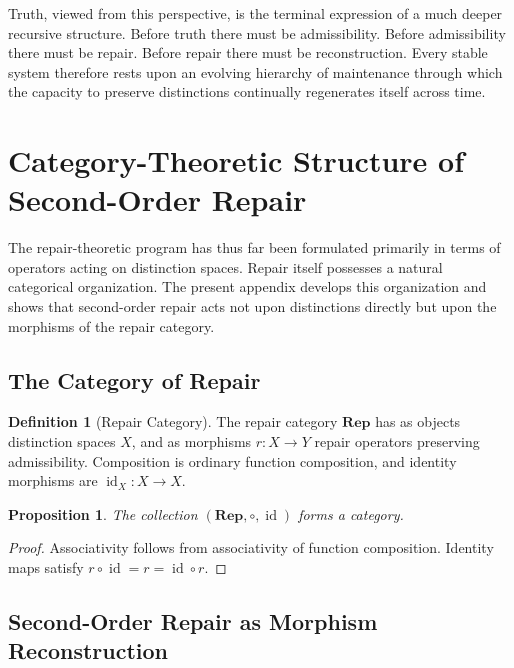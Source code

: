\documentclass[12pt,oneside]{article}
\theoremstyle{plain}
\newtheorem{proposition}[theorem]{Proposition}
\theoremstyle{definition}
\newtheorem{definition}[theorem]{Definition}
\theoremstyle{remark}
\theoremstyle{plain}
\begin{document}
Truth, viewed from this perspective, is the terminal expression of a much deeper recursive
structure. Before truth there must be admissibility. Before admissibility there must be repair.
Before repair there must be reconstruction. Every stable system therefore rests upon an evolving
hierarchy of maintenance through which the capacity to preserve distinctions continually regenerates
itself across time.

\newpage
\appendix

\section{Category-Theoretic Structure of Second-Order Repair}

The repair-theoretic program has thus far been formulated primarily in terms of operators acting on
distinction spaces. Repair itself possesses a natural categorical organization. The present appendix
develops this organization and shows that second-order repair acts not upon distinctions directly
but upon the morphisms of the repair category.

\subsection{The Category of Repair}

\begin{definition}[Repair Category]
The repair category $\mathbf{Rep}$ has as objects distinction spaces $X$, and as morphisms
$r : X \rightarrow Y$ repair operators preserving admissibility. Composition is ordinary function
composition, and identity morphisms are $\operatorname{id}_X : X \rightarrow X$.
\end{definition}

\begin{proposition}
The collection $(\mathbf{Rep}, \circ, \operatorname{id})$ forms a category.
\end{proposition}

\begin{proof}
Associativity follows from associativity of function composition. Identity maps satisfy
$r \circ \operatorname{id} = r = \operatorname{id} \circ r$.
\end{proof}

\subsection{Second-Order Repair as Morphism Reconstruction}
\end{document}
